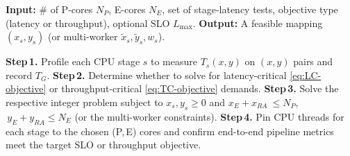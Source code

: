 \begin{algorithm}[t]
\caption{Quick-Profiling and Adaptation}
\label{alg:profiling}
\begin{algorithmic}[1]
\State \textbf{Input:} \# of P-cores $N_P$, E-cores $N_E$, set of stage-latency tests,
       objective type (latency or throughput), optional SLO $L_{\max}$.
\State \textbf{Output:} A feasible mapping $(x_s,y_s)$ (or multi-worker $\tilde{x}_s,\tilde{y}_s,w_s$).

\State \textbf{Step\,1.} Profile each CPU stage $s$ to measure $T_s(x,y)$ on $(x,y)$ pairs and record $T_G$.
\State \textbf{Step\,2.} Determine whether to solve for latency-critical \eqref{eq:LC-objective} 
      or throughput-critical \eqref{eq:TC-objective} demands. 
\State \textbf{Step\,3.} Solve the respective integer problem subject to $x_s,y_s \ge 0$ and
      $x_E+x_{RA}\ \le N_P$, $\,y_E+y_{RA} \le N_E$ (or the multi-worker constraints).
\State \textbf{Step\,4.} Pin CPU threads for each stage to the chosen (P,\,E) cores and confirm
      end-to-end pipeline metrics meet the target SLO or throughput objective.
\end{algorithmic}
\end{algorithm}
